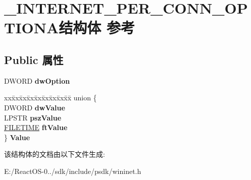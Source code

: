 \hypertarget{struct___i_n_t_e_r_n_e_t___p_e_r___c_o_n_n___o_p_t_i_o_n_a}{}\section{\+\_\+\+I\+N\+T\+E\+R\+N\+E\+T\+\_\+\+P\+E\+R\+\_\+\+C\+O\+N\+N\+\_\+\+O\+P\+T\+I\+O\+N\+A结构体 参考}
\label{struct___i_n_t_e_r_n_e_t___p_e_r___c_o_n_n___o_p_t_i_o_n_a}
\subsection*{Public 属性}
\begin{DoxyCompactItemize}
\item 
\mbox{\label{struct___i_n_t_e_r_n_e_t___p_e_r___c_o_n_n___o_p_t_i_o_n_a_a7a23f70c67b7b29f145b6e501878c13a}} 
D\+W\+O\+RD {\bfseries dw\+Option}
\item 
\mbox{\label{struct___i_n_t_e_r_n_e_t___p_e_r___c_o_n_n___o_p_t_i_o_n_a_a4343bbbc55eed711714ea4737f168f75}} 
\begin{tabbing}
xx\=xx\=xx\=xx\=xx\=xx\=xx\=xx\=xx\=\kill
union \{\\
\>DWORD {\bfseries dwValue}\\
\>LPSTR {\bfseries pszValue}\\
\>\hyperlink{struct___f_i_l_e_t_i_m_e}{FILETIME} {\bfseries ftValue}\\
\} {\bfseries Value}\\

\end{tabbing}\end{DoxyCompactItemize}


该结构体的文档由以下文件生成\+:\begin{DoxyCompactItemize}
\item 
E\+:/\+React\+O\+S-\/0../sdk/include/psdk/wininet.\+h\end{DoxyCompactItemize}
